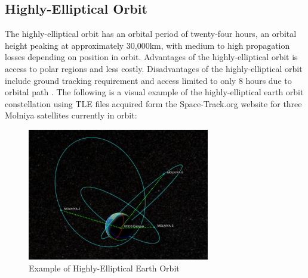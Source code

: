 \documentclass[conference]{IEEEtran}
\begin{document}
\subsection{Highly-Elliptical Orbit}
The highly-elliptical orbit has an orbital period of twenty-four hours, an orbital height peaking at approximately 30,000km, with medium to high propagation losses depending on position in orbit. Advantages of the highly-elliptical orbit is access to polar regions and less costly. Disadvantages of the highly-elliptical orbit include ground tracking requirement and access limited to only 8 hours due to orbital path \cite{b20}.  The following is a visual example of the highly-elliptical earth orbit constellation using TLE files acquired form the Space-Track.org website for three Molniya satellites currently in orbit:
\begin{figure}[h]
\centerline{\includegraphics{constellation5copy.png}}
\caption{Example of Highly-Elliptical Earth Orbit}
\label{fig:7}
\end{figure}
\end{document}
